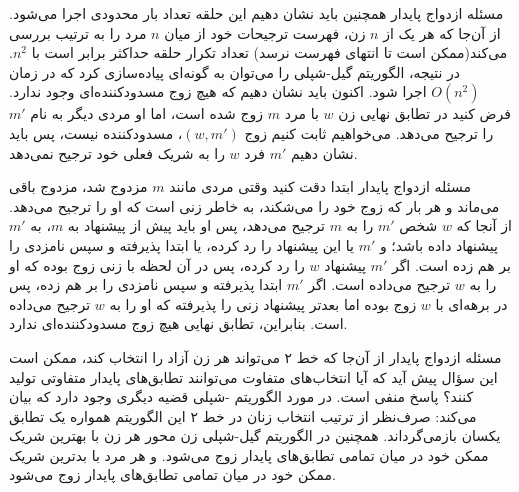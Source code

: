 \begin{itemframe}{مسئله ازدواج پایدار}
\itm
همچنین باید نشان دهیم این حلقه‌ تعداد بار محدودی اجرا می‌شود.
 از آن‌جا که هر یک از $n$ زن، فهرست ترجیحات خود از میان $n$ مرد را به ترتیب بررسی می‌کند‌(ممکن است تا انتهای فهرست نرسد) تعداد تکرار حلقه حداکثر برابر است با
$n^2$.
\itm
در نتیجه‌، الگوریتم گیل-شپلی را می‌توان به گونه‌ای پیاده‌سازی کرد که در زمان $O(n^2)$ اجرا شود.
\itm
اکنون باید نشان دهیم که هیچ زوج مسدودکننده‌ای وجود ندارد.
\itm
فرض کنید در تطابق نهایی زن $w$ با مرد $m$ زوج شده است، اما او مردی دیگر به نام $m'$ را ترجیح می‌دهد.
می‌خواهیم ثابت کنیم زوج $(w, m')$، مسدودکننده نیست، پس باید نشان دهیم $m'$ فرد $w$ را به شریک فعلی خود ترجیح نمی‌دهد.
\end{itemframe}


\begin{itemframe}{مسئله ازدواج پایدار}
\itm
ابتدا دقت کنید وقتی مردی مانند $m$ مزدوج شد، مزدوج باقی می‌ماند و هر بار که زوج خود را می‌شکند، به خاطر زنی است که او را ترجیح می‌دهد.
\itm
از آنجا که $w$ شخص $m'$ را به $m$ ترجیح می‌دهد، پس او باید پیش از پیشنهاد به $m$، به $m'$ پیشنهاد داده باشد؛ و $m'$ یا این پیشنهاد را رد کرده، یا ابتدا پذیرفته و سپس نامزدی را بر هم زده است.
\itm
اگر $m'$ پیشنهاد $w$ را رد کرده، پس در آن لحظه با زنی زوج بوده که او را به $w$ ترجیح می‌داده است.
 اگر $m'$ ابتدا پذیرفته و سپس نامزدی را بر هم زده، پس در برهه‌ای با $w$ زوج بوده اما بعدتر پیشنهاد زنی را پذیرفته که او را به $w$ ترجیح می‌داده است.
\itm
بنابراین، تطابق نهایی هیچ زوج مسدودکننده‌ای ندارد.
\end{itemframe}


\begin{itemframe}{مسئله ازدواج پایدار}
\itm
از آن‌جا که خط ۲ می‌تواند هر زن آزاد را انتخاب کند، ممکن است این سؤال پیش آید که آیا انتخاب‌های متفاوت می‌توانند تطابق‌های پایدار متفاوتی تولید کنند؟ پاسخ منفی است.
\itm
در مورد الگوریتم -شپلی قضیه دیگری وجود دارد که بیان می‌کند: صرف‌نظر از ترتیب انتخاب زنان در خط ۲ این الگوریتم همواره یک تطابق یکسان بازمی‌گرداند.
\itm
همچنین در الگوریتم گیل-شپلی زن محور هر زن با بهترین شریک ممکن خود در میان تمامی تطابق‌های پایدار زوج می‌شود. و هر مرد با بدترین شریک ممکن خود در میان تمامی تطابق‌های پایدار زوج می‌شود.
\end{itemframe}